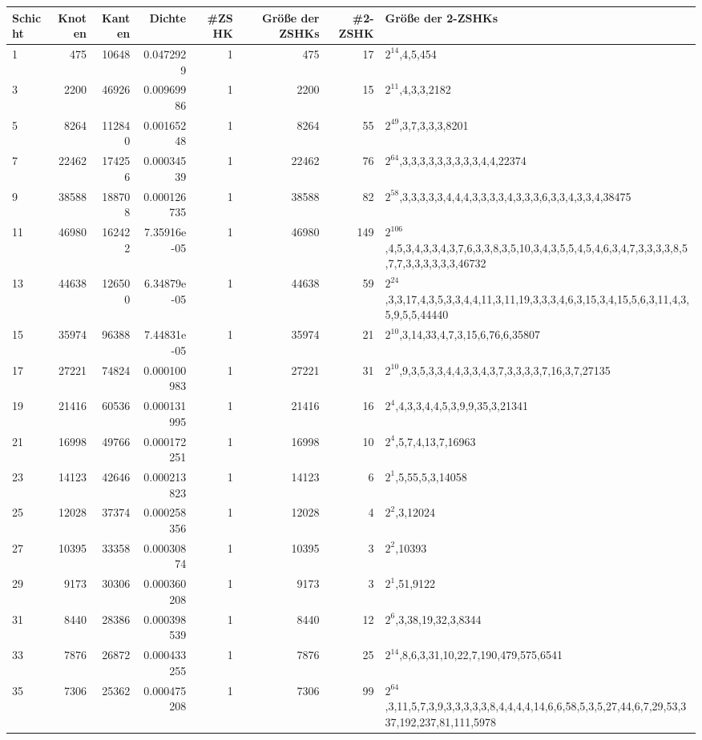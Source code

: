 \documentclass[10pt,a4paper]{standalone}
\begin{document}
\begin{tabular}{l|r|r|r|r|r|r|l|}
        Schicht & Knoten & Kanten & Dichte & \#ZSHK & Größe der ZSHKs & \#2-ZSHK & Größe der 2-ZSHKs \\ \hline
        1 & 475 & 10648 & 0.0472929 & 1 & 475 & 17 & $2^{14}$,4,5,454 \\ \hline
3 & 2200 & 46926 & 0.00969986 & 1 & 2200 & 15 & $2^{11}$,4,3,3,2182 \\ \hline
5 & 8264 & 112840 & 0.00165248 & 1 & 8264 & 55 & $2^{49}$,3,7,3,3,3,8201 \\ \hline
7 & 22462 & 174256 & 0.00034539 & 1 & 22462 & 76 & $2^{64}$,3,3,3,3,3,3,3,3,3,4,4,22374 \\ \hline
9 & 38588 & 188708 & 0.000126735 & 1 & 38588 & 82 & $2^{58}$,3,3,3,3,3,4,4,4,3,3,3,3,4,3,3,3,6,3,3,4,3,3,4,38475 \\ \hline
11 & 46980 & 162422 & 7.35916e-05 & 1 & 46980 & 149 & $2^{106}$,4,5,3,4,3,3,4,3,7,6,3,3,8,3,5,10,3,4,3,5,5,4,5,4,6,3,4,7,3,3,3,3,8,5,7,7,3,3,3,3,3,3,46732 \\ \hline
13 & 44638 & 126500 & 6.34879e-05 & 1 & 44638 & 59 & $2^{24}$,3,3,17,4,3,5,3,3,4,4,11,3,11,19,3,3,3,4,6,3,15,3,4,15,5,6,3,11,4,3,5,9,5,5,44440 \\ \hline
15 & 35974 & 96388 & 7.44831e-05 & 1 & 35974 & 21 & $2^{10}$,3,14,33,4,7,3,15,6,76,6,35807 \\ \hline
17 & 27221 & 74824 & 0.000100983 & 1 & 27221 & 31 & $2^{10}$,9,3,5,3,3,4,4,3,3,4,3,7,3,3,3,3,7,16,3,7,27135 \\ \hline
19 & 21416 & 60536 & 0.000131995 & 1 & 21416 & 16 & $2^{4}$,4,3,3,4,4,5,3,9,9,35,3,21341 \\ \hline
21 & 16998 & 49766 & 0.000172251 & 1 & 16998 & 10 & $2^{4}$,5,7,4,13,7,16963 \\ \hline
23 & 14123 & 42646 & 0.000213823 & 1 & 14123 & 6 & $2^{1}$,5,55,5,3,14058 \\ \hline
25 & 12028 & 37374 & 0.000258356 & 1 & 12028 & 4 & $2^{2}$,3,12024 \\ \hline
27 & 10395 & 33358 & 0.00030874 & 1 & 10395 & 3 & $2^{2}$,10393 \\ \hline
29 & 9173 & 30306 & 0.000360208 & 1 & 9173 & 3 & $2^{1}$,51,9122 \\ \hline
31 & 8440 & 28386 & 0.000398539 & 1 & 8440 & 12 & $2^{6}$,3,38,19,32,3,8344 \\ \hline
33 & 7876 & 26872 & 0.000433255 & 1 & 7876 & 25 & $2^{14}$,8,6,3,31,10,22,7,190,479,575,6541 \\ \hline
35 & 7306 & 25362 & 0.000475208 & 1 & 7306 & 99 & $2^{64}$,3,11,5,7,3,9,3,3,3,3,3,8,4,4,4,4,14,6,6,58,5,3,5,27,44,6,7,29,53,337,192,237,81,111,5978 \\ \hline

\end{tabular}
\end{document}
